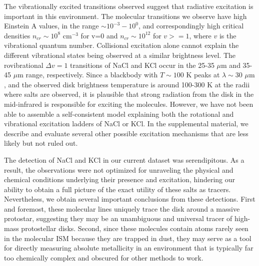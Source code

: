 \documentclass[12pt]{article}
\newcommand{\percc}{\ensuremath{\textrm{cm}^{-3}}\xspace}
\newcommand{\um}{\ensuremath{\mu \textrm{m}}\xspace}    %
\begin{document}
The vibrationally excited transitions observed suggest that radiative
excitation is important in this environment.  The molecular transitions we
observe have high Einstein A values, in the range $\sim10^{-3}-10^0$, and
correspondingly high critical densities $n_{cr} \sim10^{8}$ \percc for v=0
and $n_{cr} \sim 10^{12}$ for $v>=1$, where $v$
is the vibrational quantum number.  Collisional excitation alone cannot explain
the different vibrational states being observed at a similar brightness level.
The rovibrational $\Delta v=1$ transitions of NaCl and KCl occur in the 25-35
\um and 35-45 \um range, respectively.  Since a blackbody with $T\sim100$ K
peaks at $\lambda\sim30$ \um, and the observed disk brightness temperature is
around 100-300 K at the radii where salts are observed, it is plausible that
strong radiation from the disk in the mid-infrared is responsible for exciting
the molecules.  However, we have not been able to assemble a self-consistent
model explaining both the rotational and vibrational excitation ladders of NaCl
or KCl.  In the supplemental material, we describe  and evaluate several other
possible excitation mechanisms that are less likely but not ruled out.

The detection of NaCl and KCl in our current dataset was serendipitous.  As a
result, the observations were not optimized for unraveling the physical and
chemical conditions underlying their presence and excitation, hindering our
ability to obtain a full picture of the exact utility of these salts as
tracers.  Nevertheless, we obtain several important conclusions from these
detections.  First and foremost, these molecular lines uniquely trace the disk
around a massive protostar, suggesting they may be an unambiguous and universal
tracer of high-mass protostellar disks. Second, since these molecules contain
atoms rarely seen in the molecular ISM because they are trapped in dust, they
may serve as a tool for directly measuring absolute metallicity in an
environment that is typically far too chemically complex and obscured for other
methods to work.



\end{document}
